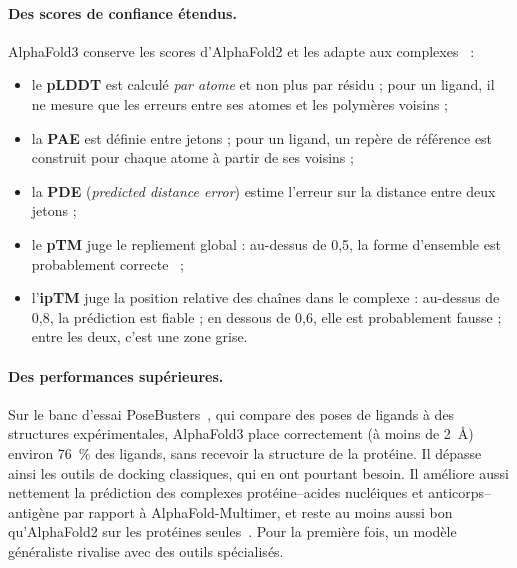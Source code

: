 \paragraph{Des scores de confiance étendus.} AlphaFold3 conserve les scores d'AlphaFold2 et les adapte aux complexes~\cite{abramson2024,alphafold_server} :
\begin{itemize}
  \item le \textbf{pLDDT} est calculé \emph{par atome} et non plus par résidu ; pour un ligand, il ne mesure que les erreurs entre ses atomes et les polymères voisins ;
  \item la \textbf{PAE} est définie entre jetons ; pour un ligand, un repère de référence est construit pour chaque atome à partir de ses voisins ;
  \item la \textbf{PDE} (\emph{predicted distance error}) estime l'erreur sur la distance entre deux jetons ;
  \item le \textbf{pTM} juge le repliement global : au-dessus de 0,5, la forme d'ensemble est probablement correcte~\cite{zhang2004} ;
  \item l'\textbf{ipTM} juge la position relative des chaînes dans le complexe : au-dessus de 0,8, la prédiction est fiable ; en dessous de 0,6, elle est probablement fausse ; entre les deux, c'est une zone grise.
\end{itemize}

\paragraph{Des performances supérieures.} Sur le banc d'essai PoseBusters~\cite{buttenschoen2024}, qui compare des poses de ligands à des structures expérimentales, AlphaFold3 place correctement (à moins de 2~Å) environ 76~\% des ligands, sans recevoir la structure de la protéine. Il dépasse ainsi les outils de docking classiques, qui en ont pourtant besoin. Il améliore aussi nettement la prédiction des complexes protéine--acides nucléiques et anticorps--antigène par rapport à AlphaFold-Multimer, et reste au moins aussi bon qu'AlphaFold2 sur les protéines seules~\cite{abramson2024}. Pour la première fois, un modèle généraliste rivalise avec des outils spécialisés.

